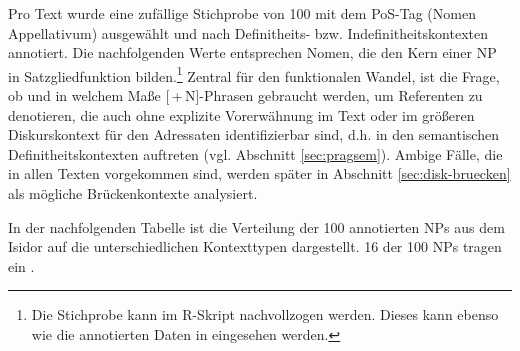Pro Text wurde eine zufällige Stichprobe von 100  mit dem PoS-Tag  (Nomen Appellativum)  ausgewählt und nach Definitheits- bzw. Indefinitheitskontexten   annotiert. Die nachfolgenden Werte entsprechen Nomen, die den Kern einer NP in Satzgliedfunktion bilden.\footnote{Die Stichprobe kann im R-Skript  nachvollzogen werden. Dieses kann ebenso wie die annotierten Daten in \textcite{HZKYL4_2020} eingesehen werden.}   
Zentral für den funktionalen Wandel, ist die Frage, ob und in welchem Maße
[\,+\,N]-Phrasen  gebraucht werden, um Referenten zu denotieren, die auch ohne explizite Vorerwähnung im Text oder im größeren Diskurskontext für den Adressaten identifizierbar sind, d.h. in den semantischen Definitheitskontexten  auftreten (vgl. Abschnitt \ref{sec:pragsem}). Ambige Fälle, die in allen Texten vorgekommen sind, werden später in Abschnitt \ref{sec:disk-bruecken} als mögliche Brückenkontexte  analysiert. 


In der nachfolgenden Tabelle ist die Verteilung der 
100 annotierten NPs aus dem Isidor auf die unterschiedlichen Kontexttypen dargestellt. 16 der 100 NPs tragen ein .


